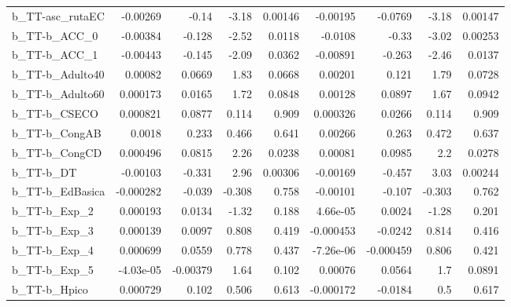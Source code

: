 \begin{tabular}{lrrrrrrrr}
b\_TT-asc\_rutaEC            &    -0.00269 &        -0.14 &     -3.18 &  0.00146 &   -0.00195 &     -0.0769 &        -3.18 &       0.00147 \\
b\_TT-b\_ACC\_0               &    -0.00384 &       -0.128 &     -2.52 &   0.0118 &    -0.0108 &       -0.33 &        -3.02 &       0.00253 \\
b\_TT-b\_ACC\_1               &    -0.00443 &       -0.145 &     -2.09 &   0.0362 &   -0.00891 &      -0.263 &        -2.46 &        0.0137 \\
b\_TT-b\_Adulto40            &     0.00082 &       0.0669 &      1.83 &   0.0668 &    0.00201 &       0.121 &         1.79 &        0.0728 \\
b\_TT-b\_Adulto60            &    0.000173 &       0.0165 &      1.72 &   0.0848 &    0.00128 &      0.0897 &         1.67 &        0.0942 \\
b\_TT-b\_CSECO               &    0.000821 &       0.0877 &     0.114 &    0.909 &   0.000326 &      0.0266 &        0.114 &         0.909 \\
b\_TT-b\_CongAB              &      0.0018 &        0.233 &     0.466 &    0.641 &    0.00266 &       0.263 &        0.472 &         0.637 \\
b\_TT-b\_CongCD              &    0.000496 &       0.0815 &      2.26 &   0.0238 &    0.00081 &      0.0985 &          2.2 &        0.0278 \\
b\_TT-b\_DT                  &    -0.00103 &       -0.331 &      2.96 &  0.00306 &   -0.00169 &      -0.457 &         3.03 &       0.00244 \\
b\_TT-b\_EdBasica            &   -0.000282 &       -0.039 &    -0.308 &    0.758 &   -0.00101 &      -0.107 &       -0.303 &         0.762 \\
b\_TT-b\_Exp\_2               &    0.000193 &       0.0134 &     -1.32 &    0.188 &   4.66e-05 &      0.0024 &        -1.28 &         0.201 \\
b\_TT-b\_Exp\_3               &    0.000139 &       0.0097 &     0.808 &    0.419 &  -0.000453 &     -0.0242 &        0.814 &         0.416 \\
b\_TT-b\_Exp\_4               &    0.000699 &       0.0559 &     0.778 &    0.437 &  -7.26e-06 &   -0.000459 &        0.806 &         0.421 \\
b\_TT-b\_Exp\_5               &   -4.03e-05 &     -0.00379 &      1.64 &    0.102 &    0.00076 &      0.0564 &          1.7 &        0.0891 \\
b\_TT-b\_Hpico               &    0.000729 &        0.102 &     0.506 &    0.613 &  -0.000172 &     -0.0184 &          0.5 &         0.617 \\

\end{tabular}

